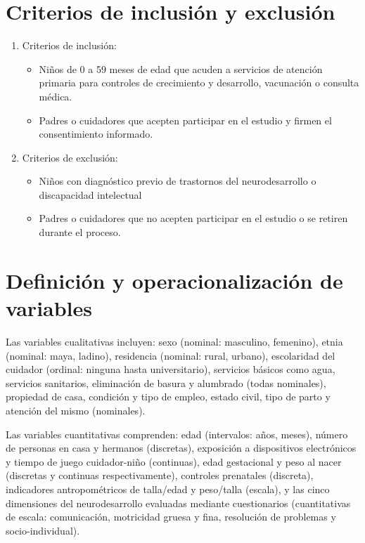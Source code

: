 \documentclass[11pt,letterpaper]{report}
\begin{document}
\section{Criterios de inclusión y exclusión}
	\begin{enumerate}
		\item Criterios de inclusión:
			\begin{itemize}
				\item Niños de 0 a 59 meses de edad que acuden a servicios de
				atención primaria para controles de crecimiento y desarrollo,
				vacunación o consulta médica.
				\item Padres o cuidadores que acepten participar en el estudio
				y firmen el consentimiento informado.
			\end{itemize}
		\item Criterios de exclusión:
			\begin{itemize}
				\item Niños con diagnóstico previo de trastornos del
				neurodesarrollo o discapacidad intelectual
				\item Padres o cuidadores que no acepten participar en el
				estudio o se retiren durante el proceso.
			\end{itemize}
	\end{enumerate}

\section{Definición y operacionalización de variables}
Las variables cualitativas incluyen: sexo (nominal: masculino, femenino), etnia
(nominal: maya, ladino), residencia (nominal: rural, urbano), escolaridad del
cuidador (ordinal: ninguna hasta universitario), servicios básicos como agua,
servicios sanitarios, eliminación de basura y alumbrado (todas nominales),
propiedad de casa, condición y tipo de empleo, estado civil, tipo de parto y
atención del mismo (nominales).

Las variables cuantitativas comprenden: edad (intervalos: años, meses), número
de personas en casa y hermanos (discretas), exposición a dispositivos
electrónicos y tiempo de juego cuidador-niño (continuas), edad gestacional y
peso al nacer (discretas y continuas respectivamente), controles prenatales
(discreta), indicadores antropométricos de talla/edad y peso/talla (escala), y
las cinco dimensiones del neurodesarrollo evaluadas mediante cuestionarios
(cuantitativas de escala: comunicación, motricidad gruesa y fina, resolución de
problemas y socio-individual).
\end{document}
